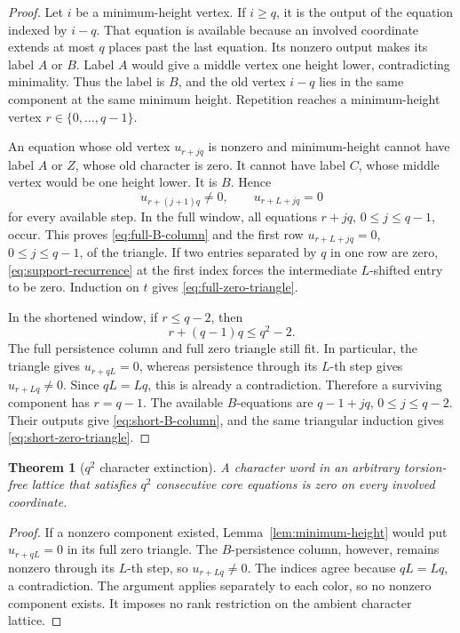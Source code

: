 \documentclass[11pt]{article}
\newtheorem{theorem}[lemma]{Theorem}
\theoremstyle{remark}
\numberwithin{equation}{section}
\begin{document}
\begin{proof}
Let \(i\) be a minimum-height vertex.  If \(i\geq q\), it is the output of the equation indexed by \(i-q\).  That equation is available because an involved coordinate extends at most \(q\) places past the last equation.  Its nonzero output makes its label \(A\) or \(B\).  Label \(A\) would give a middle vertex one height lower, contradicting minimality.  Thus the label is \(B\), and the old vertex \(i-q\) lies in the same component at the same minimum height.  Repetition reaches a minimum-height vertex \(r\in\{0,\ldots,q-1\}\).

An equation whose old vertex \(u_{r+jq}\) is nonzero and minimum-height cannot have label \(A\) or \(Z\), whose old character is zero.  It cannot have label \(C\), whose middle vertex would be one height lower.  It is \(B\).  Hence
\begin{equation}\label{eq:B-persistence-step}
 u_{r+(j+1)q}\neq0,\qquad u_{r+L+jq}=0
\end{equation}
for every available step.  In the full window, all equations \(r+jq\), \(0\leq j\leq q-1\), occur.  This proves \eqref{eq:full-B-column} and the first row \(u_{r+L+jq}=0\), \(0\leq j\leq q-1\), of the triangle.  If two entries separated by \(q\) in one row are zero, \eqref{eq:support-recurrence} at the first index forces the intermediate \(L\)-shifted entry to be zero.  Induction on \(t\) gives \eqref{eq:full-zero-triangle}.

In the shortened window, if \(r\leq q-2\), then
\[
 r+(q-1)q\leq q^2-2.
\]
The full persistence column and full zero triangle still fit.  In particular, the triangle gives \(u_{r+qL}=0\), whereas persistence through its \(L\)-th step gives \(u_{r+Lq}\neq0\).  Since \(qL=Lq\), this is already a contradiction.  Therefore a surviving component has \(r=q-1\).  The available \(B\)-equations are \(q-1+jq\), \(0\leq j\leq q-2\).  Their outputs give \eqref{eq:short-B-column}, and the same triangular induction gives \eqref{eq:short-zero-triangle}.
\end{proof}

\begin{theorem}[\(q^2\) character extinction]\label{thm:q2-extinction}
A character word in an arbitrary torsion-free lattice that satisfies \(q^2\) consecutive core equations is zero on every involved coordinate.
\end{theorem}

\begin{proof}
If a nonzero component existed, Lemma~\ref{lem:minimum-height} would put \(u_{r+qL}=0\) in its full zero triangle.  The \(B\)-persistence column, however, remains nonzero through its \(L\)-th step, so \(u_{r+Lq}\neq0\).  The indices agree because \(qL=Lq\), a contradiction.  The argument applies separately to each color, so no nonzero component exists.  It imposes no rank restriction on the ambient character lattice.
\end{proof}
\end{document}
